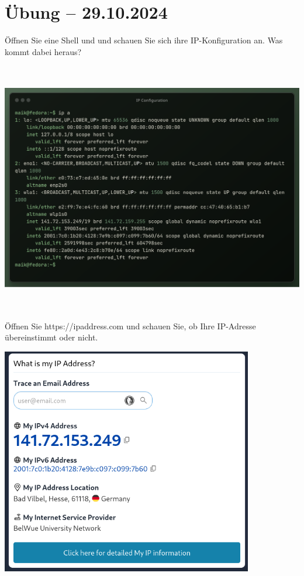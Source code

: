 \documentclass[11pt]{article}
\begin{document}
\section{Übung -- 29.10.2024}
\begin{aufgabe}
  Öffnen Sie eine Shell und und schauen Sie sich ihre IP-Konfiguration an. Was kommt dabei heraus?

  \centering
  \includegraphics[height=11cm]{ip-configuration}
\end{aufgabe}
\newpage
\begin{aufgabe}
  Öffnen Sie https://ipaddress.com und schauen Sie, ob Ihre IP-Adresse übereinstimmt oder nicht.

  \centering
  \includegraphics[width=11cm]{ip-address.png}
\end{aufgabe}
\end{document}
